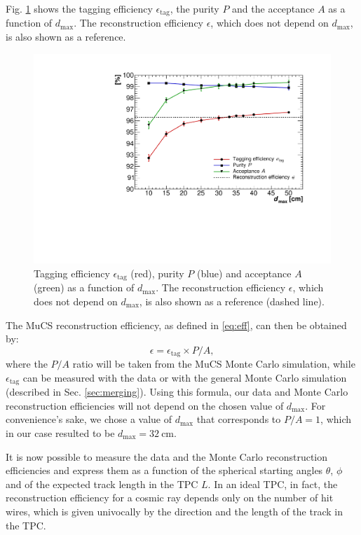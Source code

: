 \documentclass[a4paper]{scrartcl}
\begin{document}
Fig. \ref{fig:purity} shows the tagging efficiency $\epsilon_{\mathrm{tag}}$, the purity $P$ and the acceptance $A$ as a function of $d_{\mathrm{max}}$. The reconstruction efficiency $\epsilon$, which does not depend on $d_{\mathrm{max}}$, is also shown as a reference.

\begin{figure}[htbp]
  \begin{center}
    \includegraphics[width=0.7\linewidth]{figures/purity.pdf}
    \caption{Tagging efficiency $\epsilon_{\mathrm{tag}}$ (red), purity $P$ (blue) and acceptance $A$ (green) as a function of $d_{\mathrm{max}}$. The reconstruction efficiency $\epsilon$, which does not depend on $d_{\mathrm{max}}$, is also shown as a reference (dashed line).} \label{fig:purity}
  \end{center}
\end{figure}

The MuCS reconstruction efficiency, as defined in \eqref{eq:eff}, can then be obtained by:
\begin{equation}
  \epsilon = \epsilon_{\mathrm{tag}} \times P / A,
\end{equation}
where the $P/A$ ratio will be taken from the MuCS Monte Carlo simulation, while $\epsilon_{\mathrm{tag}}$ can be measured with the data or with the general Monte Carlo simulation (described in Sec. \ref{sec:merging}).
Using this formula, our data and Monte Carlo reconstruction efficiencies will not depend on the chosen value of $d_{\mathrm{max}}$. For convenience's sake, we chose a value of $d_{\mathrm{max}}$ that corresponds to $P/A = 1$, which in our case resulted to be $d_{\mathrm{max}}=32~\mathrm{cm}$.

It is now possible to measure the data and the Monte Carlo reconstruction efficiencies and express them as a function of the spherical starting angles $\theta$, $\phi$ and of the expected track length in the TPC $L$. In an ideal TPC, in fact, the reconstruction efficiency for a cosmic ray depends only on the number of hit wires, which is given univocally by the direction and the length of the track in the TPC.
\end{document}
